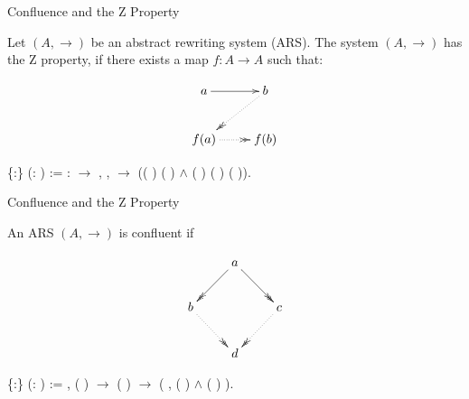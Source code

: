 \documentclass[10pt]{beamer}
\begin{document}
\begin{frame}[fragile]{Confluence and the Z Property}  
  \begin{definition}[Z Property]
    Let $(A,\to)$ be an abstract rewriting system (ARS). The system
    $(A,\to)$ has the Z property, if there exists a map $f:A \to A$
    such that:
    
    \[
      \xymatrix{
        a \ar[r] &  b \ar@{.>>}[dl]\\
        f(a) \ar@{.>>}[r] & f(b) \\ 
      }
    \]
\end{definition}

  \begin{coqdoccode}
    \coqdocemptyline \coqdocnoindent {}
     \{:\}
    (:  ) :=
    \coqdoctac{\ensuremath{\exists}} :
    \ensuremath{\rightarrow} ,
    \coqdockw{\ensuremath{\forall}}  ,
       \ensuremath{\rightarrow}
    (( ) 
    ( ) \ensuremath{\land}
    ( ) (
    ) ( )).\coqdoceol
  \end{coqdoccode}
\end{frame}

\begin{frame}[fragile]{Confluence and the Z Property}
  
  \begin{definition}[Confluence]
    An ARS $(A,\to)$ is confluent if
    
    \[
      \xymatrix{
        & a \ar@{->>}[dl] \ar@{->>}[dr] & \\
        b \ar@{.>>}[dr] &  & c \ar@{.>>}[dl] \\
        & d & 
      }
    \]
  \end{definition}
  
  \begin{coqdoccode}
      \{:\} (:  ) := \coqdockw{\ensuremath{\forall}}   , ( )   \ensuremath{\rightarrow} ( )   \ensuremath{\rightarrow} (\coqdoctac{\ensuremath{\exists}} , ( )   \ensuremath{\land} ( )  ).\coqdoceol
  \end{coqdoccode}
\end{frame}
\end{document}
